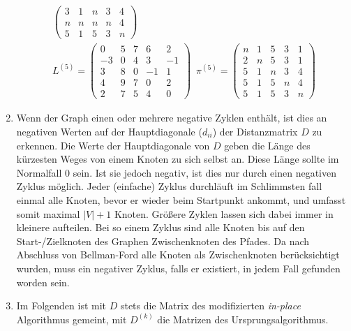 \documentclass[11pt,a4paper]{article}
\begin{document}
\begin{loesung}
\begin{enumerate}
\begin{align*}
\begin{pmatrix}
                3 & 1 & n & 3 & 4 \\
                n & n & n & n & 4 \\
                5 & 1 & 5 & 3 & n
            \end{pmatrix} \\
            L^{(5)} = \begin{pmatrix}
                0 & 5 & 7 & 6 & 2 \\
                -3 & 0 & 4 & 3 & -1 \\
                3 & 8 & 0 & -1 & 1 \\
                4 & 9 & 7 & 0 & 2 \\
                2 & 7 & 5 & 4 & 0
            \end{pmatrix}\,\,\,
            \pi^{(5)} = \begin{pmatrix}
                n & 1 & 5 & 3 & 1 \\
                2 & n & 5 & 3 & 1 \\
                5 & 1 & n & 3 & 4 \\
                5 & 1 & 5 & n & 4 \\
                5 & 1 & 5 & 3 & n
            \end{pmatrix}
        \end{align*}

        \item
        Wenn der Graph einen oder mehrere negative Zyklen enthält, ist dies an negativen Werten auf der Hauptdiagonale ($d_{ii}$) der Distanzmatrix $D$ zu erkennen.
        Die Werte der Hauptdiagonale von $D$ geben die Länge des kürzesten Weges von einem Knoten zu sich selbst an.
        Diese Länge sollte im Normalfall 0 sein.
        Ist sie jedoch negativ, ist dies nur durch einen negativen Zyklus möglich.
        Jeder (einfache) Zyklus durchläuft im Schlimmsten fall einmal alle Knoten, bevor er wieder beim Startpunkt ankommt, und umfasst somit maximal $|V|+1$ Knoten.
        Größere Zyklen lassen sich dabei immer in kleinere aufteilen.
        Bei so einem  Zyklus sind alle Knoten bis auf den Start-/Zielknoten des Graphen Zwischenknoten des Pfades.
        Da nach Abschluss von Bellman-Ford alle Knoten als Zwischenknoten berücksichtigt wurden, muss ein negativer Zyklus, falls er existiert, in jedem Fall gefunden worden sein.
        \item
        Im Folgenden ist mit $D$ stets die Matrix des modifizierten \emph{in-place} Algorithmus gemeint, mit $D^{(k)}$ die Matrizen des Ursprungsalgorithmus.


\end{enumerate}
\end{loesung}
\end{document}
